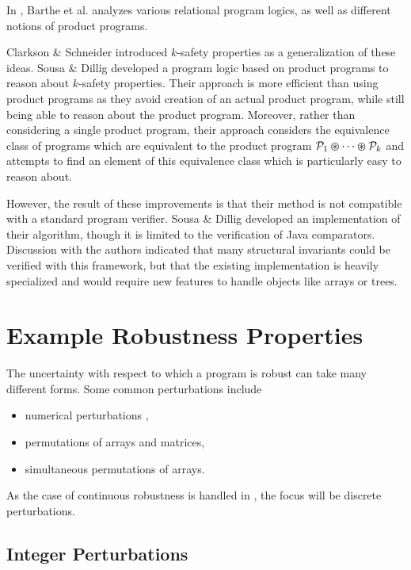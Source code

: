 \documentclass{llncs}
\begin{document}
    In \cite{bartheanalysis}, Barthe et al.
    analyzes various relational program logics, as well as different notions of
    product programs.
    \smallskip

    \space\space Clarkson \& Schneider
    \cite{clarkson08} introduced \(k\)-safety properties as a generalization of 
    these ideas. Sousa \& Dillig \cite{sousa16} developed a program logic based on product programs
    to reason about \(k\)-safety properties.  Their approach is more efficient than
    using product programs as they avoid creation of an actual product program, while
    still being able to reason about the product program.  Moreover, rather than
    considering a single product program, their approach considers the equivalence
    class of programs which are equivalent to the product program
    \(\mathcal{P}_{1} \varoast \dotsb \varoast \mathcal{P}_{k}\) and attempts to
    find an element of this equivalence class which is particularly easy
    to reason about.

    However, the result of these improvements is that their method is not compatible
    with a standard program verifier. Sousa \& Dillig developed
    an implementation of their algorithm, though it is limited to the verification
    of Java comparators.
    Discussion with the authors indicated that many structural invariants could
    be verified with this framework, but that the existing implementation is
    heavily specialized and would require new features to handle objects like
    arrays or trees.

\section{Example Robustness Properties}

  The uncertainty with respect to which a program is robust can take many
  different forms.  Some common perturbations include
  \begin{itemize}
    \item numerical perturbations \cite{samanta14,chaudhuri10,chaudhuri11},
    \item permutations of arrays and matrices,
    \item simultaneous permutations of arrays.
  \end{itemize}
  As the case of continuous robustness is handled in \cite{chaudhuri10,chaudhuri11},
  the focus will be discrete perturbations.

  \subsection{Integer Perturbations}
\end{document}
